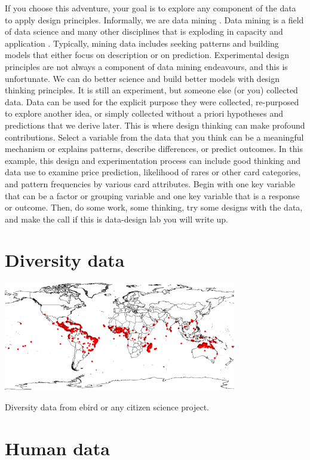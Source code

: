 \documentclass[
]{book}
\begin{document}
If you choose this adventure, your goal is to explore any component of the data to apply design principles. Informally, we are data mining \citep{RN6800}. Data mining is a field of data science and many other disciplines that is exploding in capacity and application \citep{RN6802, RN6801}. Typically, mining data includes seeking patterns and building models that either focus on description or on prediction. Experimental design principles are not always a component of data mining endeavours, and this is unfortunate. We can do better science and build better models with design thinking principles. It is still an experiment, but someone else (or you) collected data. Data can be used for the explicit purpose they were collected, re-purposed to explore another idea, or simply collected without a priori hypotheses and predictions that we derive later. This is where design thinking can make profound contributions. Select a variable from the data that you think can be a meaningful mechanism or explains patterns, describe differences, or predict outcomes. In this example, this design and experimentation process can include good thinking and data use to examine price prediction, likelihood of rares or other card categories, and pattern frequencies by various card attributes. Begin with one key variable that can be a factor or grouping variable and one key variable that is a response or outcome. Then, do some work, some thinking, try some designs with the data, and make the call if this is data-design lab you will write up.

\hypertarget{diversity}{%
\chapter{Diversity data}\label{diversity}}

\includegraphics[width=4in,height=\textheight]{./gbif.png}

Diversity data from ebird or any citizen science project.

\hypertarget{humans}{%
\chapter{Human data}\label{humans}}
\end{document}
